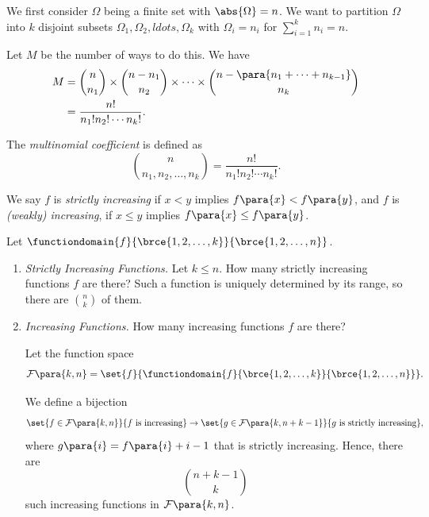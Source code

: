 \begin{example}
    \label{ex:partition-sets-given-size}%
    We first consider \(\Omega\) being a finite set with \(\abs{\Omega} = n\). We want to partition \(\Omega\) into \(k\) disjoint subsets \(\Omega_1, \Omega_2, ldots, \Omega_k\) with \(\Omega_i = n_i\) for \(\sum_{i = 1}^{k} n_i = n\).

    Let \(M\) be the number of ways to do this. We have
    \begin{align*}
        M &= \binom{n}{n_1} \times \binom{n - n_1}{n_2} \times \cdots \times \binom{n - \para{n_1 + \cdots + n_{k - 1}}}{n_k} \\
        &= \frac{n!}{n_1! n_2! \cdots n_k!}.
    \end{align*}
\end{example}

\begin{definition}
    \label{def:multinomial-coeff}%
    The \emph{multinomial coefficient} is defined as
    \[
        \binom{n}{n_1, n_2, \ldots, n_k} = \frac{n!}{n_1! n_2! \cdots n_k!}.
    \]
\end{definition}

\begin{examples}
    \label{ex:increasing-functions}%
    We say \(f\) is \emph{strictly increasing} if \(x < y\) implies \(f\para{x} < f\para{y}\), and \(f\) is \emph{(weakly) increasing}, if \(x \leq y\) implies \(f\para{x} \leq f\para{y}\).

    Let \(\functiondomain{f}{\brce{1, 2, \ldots, k}}{\brce{1, 2, \ldots, n}}\).
    
    \begin{enumerate}
        \item \textit{Strictly Increasing Functions.} Let \(k \leq n\). How many strictly increasing functions \(f\) are there? Such a function is uniquely determined by its range, so there are \(\binom{n}{k}\) of them.
        \item \textit{Increasing Functions.} How many increasing functions \(f\) are there?
        
        Let the function space
        \[
            \mathcal{F}\para{k, n} = \set{f}{\functiondomain{f}{\brce{1, 2, \ldots, k}}{\brce{1, 2, \ldots, n}}}.
        \]
        
        We define a bijection
        \[
            \set{f \in \mathcal{F}\para{k, n}}{f \text{ is increasing}} \to \set{g \in \mathcal{F}\para{k, n + k - 1}}{g \text{ is strictly increasing}},
        \]
        where \(g\para{i} = f\para{i} + i - 1\) that is strictly increasing. Hence, there are
        \[
            \binom{n + k - 1}{k}
        \]
        such increasing functions in \(\mathcal{F}\para{k, n}\).
    \end{enumerate}
\end{examples}

